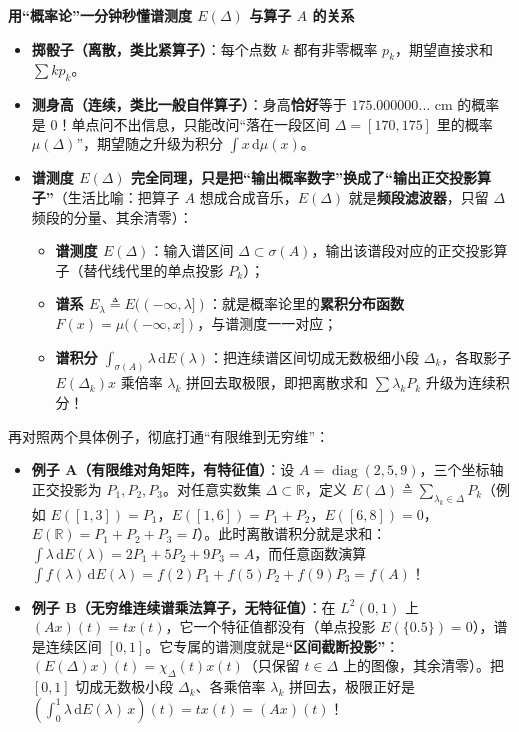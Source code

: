 \documentclass[11pt,a4paper]{article}
\providecommand{\tightlist}{\setlength{\itemsep}{2pt}\setlength{\parskip}{0pt}}
\newcommand{\StepHeading}[1]{%
  \Needspace{3.5\baselineskip}\vspace{4.5pt}\noindent
  {\small\bfseries\color{AccentMain}#1}\par\vspace{2pt}%
}
\begin{document}
\StepHeading{用``概率论''一分钟秒懂谱测度 \(E(\Delta)\) 与算子 \(A\) 的关系}

\begin{itemize}
\tightlist
\item
  \textbf{掷骰子（离散，类比紧算子）}：每个点数 \(k\) 都有非零概率 \(p_k\)，期望直接求和 \(\sum k p_k\)。
\item
  \textbf{测身高（连续，类比一般自伴算子）}：身高\textbf{恰好}等于 \(175.000000\dots\) cm 的概率是 \textbf{\(0\)}！单点问不出信息，只能改问``落在一段区间 \(\Delta = [170, 175]\) 里的概率 \(\mu(\Delta)\)''，期望随之升级为积分 \(\int x\,\mathrm{d}\mu(x)\)。
\item
  \textbf{谱测度 \(E(\Delta)\) 完全同理，只是把``输出概率数字''换成了``输出正交投影算子''}（生活比喻：把算子 \(A\) 想成合成音乐，\(E(\Delta)\) 就是\textbf{频段滤波器}，只留 \(\Delta\) 频段的分量、其余清零）：

  \begin{itemize}
  \tightlist
  \item
    \textbf{谱测度 \(E(\Delta)\)}：输入谱区间 \(\Delta \subset \sigma(A)\)，输出该谱段对应的正交投影算子（替代线代里的单点投影 \(P_k\)）；
  \item
    \textbf{谱系 \(E_\lambda \triangleq E((-\infty, \lambda])\)}：就是概率论里的\textbf{累积分布函数 \(F(x) = \mu((-\infty, x])\)}，与谱测度一一对应；
  \item
    \textbf{谱积分 \(\int_{\sigma(A)} \lambda\,\mathrm{d}E(\lambda)\)}：把连续谱区间切成无数极细小段 \(\Delta_k\)，各取影子 \(E(\Delta_k)x\) 乘倍率 \(\lambda_k\) 拼回去取极限，即把离散求和 \(\sum \lambda_k P_k\) 升级为连续积分！
  \end{itemize}
\end{itemize}

再对照两个具体例子，彻底打通``有限维到无穷维''：

\begin{itemize}
\tightlist
\item
  \textbf{例子 A（有限维对角矩阵，有特征值）}：设 \(A = \operatorname{diag}(2, 5, 9)\)，三个坐标轴正交投影为 \(P_1, P_2, P_3\)。对任意实数集 \(\Delta \subset \mathbb{R}\)，定义 \(E(\Delta) \triangleq \sum_{\lambda_k \in \Delta} P_k\)（例如 \(E([1,3])=P_1\)，\(E([1,6])=P_1+P_2\)，\(E([6,8])=0\)，\(E(\mathbb{R})=P_1+P_2+P_3=I\)）。此时离散谱积分就是求和：\(\int \lambda\,\mathrm{d}E(\lambda) = 2P_1 + 5P_2 + 9P_3 = A\)，而任意函数演算 \(\int f(\lambda)\,\mathrm{d}E(\lambda) = f(2)P_1 + f(5)P_2 + f(9)P_3 = f(A)\)！
\item
  \textbf{例子 B（无穷维连续谱乘法算子，无特征值）}：在 \(L^2(0,1)\) 上 \((Ax)(t) = t x(t)\)，它一个特征值都没有（单点投影 \(E(\{0.5\})=0\)），谱是连续区间 \([0,1]\)。它专属的谱测度就是\textbf{``区间截断投影''}：\((E(\Delta)x)(t) = \chi_\Delta(t)x(t)\)（只保留 \(t\in\Delta\) 上的图像，其余清零）。把 \([0,1]\) 切成无数极小段 \(\Delta_k\)、各乘倍率 \(\lambda_k\) 拼回去，极限正好是 \(\left(\int_0^1 \lambda\,\mathrm{d}E(\lambda)\,x\right)(t) = t x(t) = (Ax)(t)\)！
\end{itemize}
\end{document}
